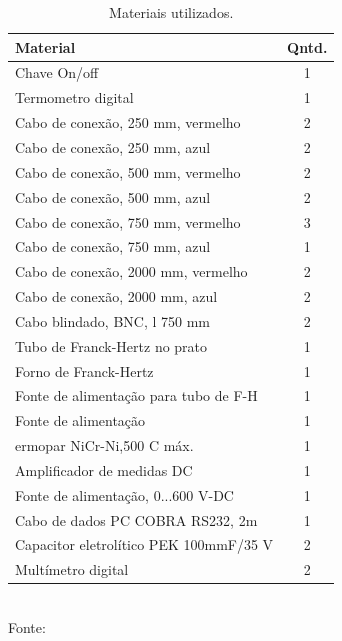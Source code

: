 \begin{table}
\centering
\caption{Materiais utilizados.}
\begin{tabular}{lc}
\toprule\midrule
Material & Qntd. \\
\midrule
Chave On/off & 1 \\
Termometro digital & 1 \\
Cabo de conexão, 250 mm, vermelho  & 2 \\
Cabo de conexão, 250 mm, azul  & 2 \\
Cabo de conexão, 500 mm, vermelho & 2 \\
Cabo de conexão, 500 mm, azul & 2 \\
Cabo de conexão, 750 mm, vermelho & 3 \\
Cabo de conexão, 750 mm, azul & 1 \\
Cabo de conexão, 2000 mm, vermelho & 2 \\
Cabo de conexão, 2000 mm, azul & 2 \\
Cabo blindado, BNC, l 750 mm & 2 \\
Tubo de Franck-Hertz no prato & 1 \\
Forno de Franck-Hertz & 1 \\
Fonte de alimentação para tubo de F-H & 1 \\
Fonte de alimentação & 1 \\
ermopar NiCr-Ni,500 C máx. & 1 \\ 
Amplificador de medidas DC & 1 \\
Fonte de alimentação, 0...600 V-DC & 1 \\
Cabo de dados PC COBRA RS232, 2m & 1 \\
Capacitor eletrolítico PEK 100mmF/35 V & 2 \\	
Multímetro digital & 2 \\
\midrule\bottomrule
\end{tabular}
\small{\\Fonte: \cite{roteiro}}
\label{tab: materiais}
\end{table}


